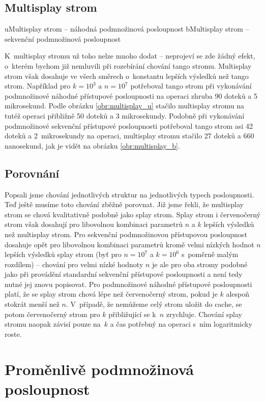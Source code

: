\subsection {Multisplay strom}

u{Multisplay strom -- náhodná podmnožinová posloupnost}
b{Multisplay strom -- sekvenční podmnožinová posloupnost}

K~multisplay stromu už toho nelze mnoho dodat -- neprojeví se zde žádný efekt,
o~kterém bychom již nemluvili při rozebírání chování tango stromu. Multisplay
strom však dosahuje ve všech směrech o~konstantu lepších výsledků než tango
strom. Například pro $k=10^3$ a $n= 10^7$ potřeboval tango strom
při vykonávání podmnožinové náhodné přístupové posloupnosti na operaci zhruba
90 doteků a 5 mikrosekund. Podle obrázku \ref{obr:multisplay_u} stačilo
multisplay stromu na tutéž operaci přibližně 50 doteků a 3 mikrosekundy.
Podobně při vykonávání podmnožinové sekvenční přístupové posloupnosti
potřeboval tango strom asi 42 doteků a 2~mikrosekundy na operaci, multisplay
stromu stačilo 27 doteků a 660 nanosekund, jak je vidět na obrázku
\ref{obr:multisplay_b}.

\subsection{Porovnání}

Popsali jsme chování jednotlivých struktur na jednotlivých typech posloupnosti.
Teď ještě musíme toto chování zběžně porovnat. Již jsme řekli, že multisplay
strom se chová kvalitativně podobně jako splay strom. Splay strom i
červenočerný strom však dosahují pro libovolnou kombinaci parametrů $n$ a $k$
lepších výsledků než multisplay strom. Pro sekvenční podmnožinovou přístupovou
posloupnost dosahuje opět pro libovolnou kombinaci parametrů kromě velmi
nízkých hodnot $n$  lepších výsledků splay strom (byť pro $n= 10^7$ a
$k= 10^6$ s~poměrně malým rozdílem) -- chování pro velmi nízké hodnoty
$n$ je ale pro oba stromy podobné jako při provádění standardní sekvenční
přístupové posloupnosti a není tedy nutné jej znovu popisovat. Pro podmnožinové
náhodné přístupové posloupnosti platí, že se splay strom chová lépe než
červenočerný strom, pokud je $k$ alespoň stokrát menší než $n$. V~případě, že
nemůžeme celý strom uložit do cache, se potom červenočerný strom pro $k$
přibližující se k~$n$ zrychluje. Chování splay stromu naopak závisí pouze na~$k$ a čas potřebný na operaci s~ním logaritmicky roste.
\newpage
\section{Proměnlivě podmnožinová posloupnost}

